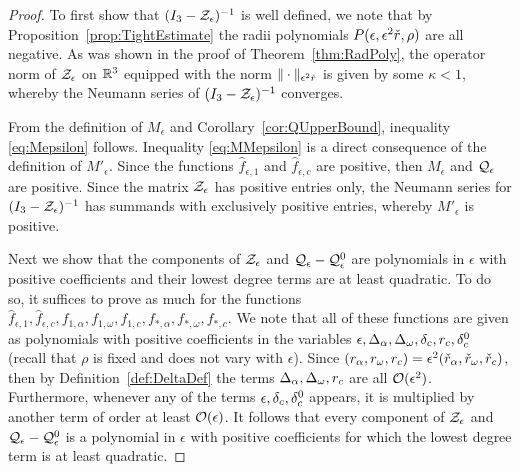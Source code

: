 \begin{proof}
To first show that $(I_3 - \mathcal{Z}_{\epsilon })^{-1}$ is well defined,  we note that by Proposition~\ref{prop:TightEstimate} 
the radii polynomials $ P(\epsilon,\epsilon^2 \check{r},\rho)$ are all negative. As was shown in the proof of Theorem~\ref{thm:RadPoly},
the operator norm of $ \mathcal{Z}_\epsilon$ on $ \mathbb{R}^3$ equipped with the norm $ \| \cdot \|_{\epsilon^2 \check{r}}$ is given by some $\kappa <1$, whereby the Neumann series of $ (I_3 - \mathcal{Z}_\epsilon)^{-1}$ converges. 
	
From the definition of $M_\epsilon$ and Corollary~\ref{cor:QUpperBound}, inequality \eqref{eq:Mepsilon} follows. Inequality \eqref{eq:MMepsilon} is a direct consequence of the definition of $M'_\epsilon$.
	Since the functions $\hat{f}_{\epsilon,1}$ and $\hat{f}_{\epsilon,c}$ are positive, then $M_\epsilon$ and $\mathcal{Q}_\epsilon$ are positive. 
	Since the matrix $ \mathcal{Z}_\epsilon$ has positive entries only,  the Neumann series for $(I_3-\mathcal{Z}_\epsilon)^{-1}$  has summands with exclusively positive entries, whereby $M'_\epsilon$ is positive. 

	Next we show that the components of $\mathcal{Z}_\epsilon$ and $\mathcal{Q}_\epsilon - \mathcal{Q}_\epsilon^0$ are polynomials in $\epsilon$ with positive coefficients and their lowest degree terms are at least quadratic. 
	To do so, it suffices to prove as much for the functions $ \hat{f}_{\epsilon,1},\hat{f}_{\epsilon,c},f_{1,\alpha},f_{1,\omega}, f_{1,c} , f_{*,\alpha}, f_{*,\omega},f_{*,c}$. 
	We note that all of these functions are given as polynomials with positive coefficients in the variables $ \epsilon, \Delta_\alpha,\Delta_\omega,\delta_c,r_c,\delta_c^0$ 
	(recall that $\rho $ is fixed and does not vary with $\epsilon$).
	Since $(r_\alpha , r_\omega,r_c) = \epsilon^2 (\check{r}_\alpha , \check{r}_\omega,\check{r}_c)$, then by Definition~\ref{def:DeltaDef} the terms $\Delta_\alpha,\Delta_\omega,r_c$ are all $ \mathcal{O}(\epsilon^2)$. 
	Furthermore, whenever any of the terms  $ \epsilon, \delta_c, \delta_c^0$ 
appears, it is multiplied by another term of order at least $\mathcal{O}(\epsilon)$.
	It  follows that every component of 
	 $ \mathcal{Z}_\epsilon$ and $ \mathcal{Q}_{\epsilon} - \mathcal{Q}_{\epsilon}^0$ is a polynomial in $ \epsilon$ with positive coefficients for which the lowest degree term is at least quadratic. 



\end{proof}
